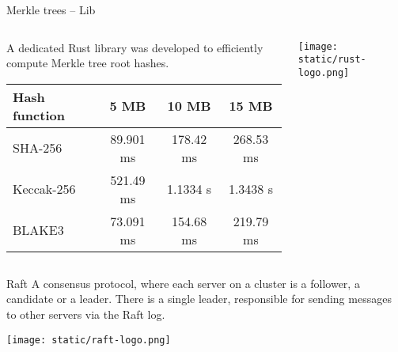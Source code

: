 \begin{frame}{Merkle trees -- Lib}
    \begin{columns}[c]
        \begin{column}{0.7\textwidth}
            A dedicated Rust library was developed to efficiently compute Merkle tree root hashes.
            \begin{table}[h!]
                \centering
                \footnotesize %
                \begin{tabular}{|l|c|c|c|}
                \hline
                    \textbf{Hash function} & \textbf{5 MB} & \textbf{10 MB} & \textbf{15 MB} \\
                \hline
                    SHA-256   & 89.901 ms  & 178.42 ms  & 268.53 ms \\
                    Keccak-256 & 521.49 ms & 1.1334 s   & 1.3438 s \\
                    BLAKE3    & 73.091 ms  & 154.68 ms  & 219.79 ms \\
                \hline
                \end{tabular}
            \end{table}
        \end{column}
        \begin{column}{0.3\textwidth}
            \centering
            \texttt{[image: static/rust-logo.png]}
        \end{column}
    \end{columns}

\end{frame}

\begin{frame}{Raft}
A consensus protocol, where each server on a cluster is a follower, a candidate
or a leader. There is a single leader, responsible for sending messages to other servers via the Raft log.

\centering
\texttt{[image: static/raft-logo.png]}

\end{frame}
